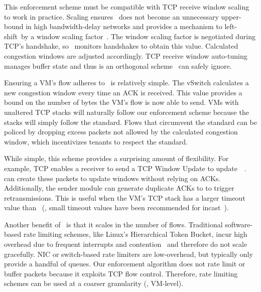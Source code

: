 This enforcement scheme must be compatible with TCP receive window scaling to work in practice.
Scaling ensures~\rwnd{} does not become an unnecessary upper-bound in high bandwidth-delay networks
and provides a mechanism to left-shift~\rwnd by a window scaling factor~\cite{RFC1323}. 
The window scaling factor is negotiated during TCP's handshake, so~\acdc{} monitors handshakes
to obtain this value. Calculated congestion windows are adjusted accordingly.
TCP receive window auto-tuning~\cite{semke1998automatic} manages buffer state
and thus is an orthogonal scheme~\acdc{} can safely ignore.

Ensuring a VM's flow adheres to~\rwnd{} is relatively simple. The vSwitch calculates a new congestion 
window every time an ACK is received. This value provides a bound on the number of bytes the VM's flow
is now able to send. VMs with unaltered TCP stacks will naturally follow our enforcement scheme because the stacks
will simply follow the standard. Flows that circumvent the standard can be policed by dropping
excess packets not allowed by the calculated congestion window, which incentivizes tenants to respect the standard.

While simple, this scheme provides a surprising amount of flexibility. For example, TCP enables
a receiver to send a TCP Window Update to update~\rwnd{}~\cite{RFC5681}.~\acdc{}
can create these packets to update windows without relying on ACKs.
Additionally, the sender module can generate duplicate ACKs to to trigger retransmissions. This is useful when 
the VM's TCP stack has a larger timeout value than~\acdc{} (\eg{}, small timeout values
have been recommended for incast~\cite{vasudevan2009safe}). 

Another benefit of~\acdc{} is that it scales in the number of flows.
Traditional software-based rate limiting schemes, like Linux's Hierarchical Token Bucket, 
incur high overhead due to frequent interrupts and contention~\cite{radhakrishnan2014senic} and
therefore do not scale gracefully. NIC or switch-based rate limiters are low-overhead, but typically
only provide a handful of queues. Our enforcement algorithm does not rate limit or buffer packets because it exploits TCP
flow control. Therefore, rate limiting schemes can be used at a coarser granularity (\eg{}, VM-level).


